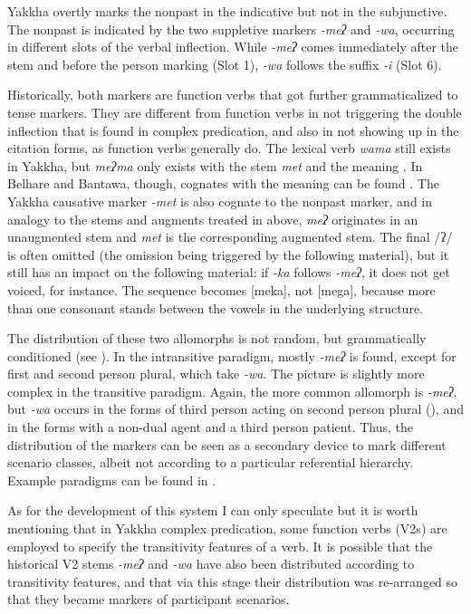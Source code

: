 Yakkha overtly marks the nonpast in the indicative but not in the subjunctive. The nonpast is indicated by the two suppletive markers \emph{-meʔ} and \emph{-wa}, occurring in different slots of the verbal inflection. While  \emph{-meʔ} comes immediately after the stem and before the person marking (Slot 1), \emph{-wa} follows the suffix \emph{-i}  (Slot 6). 

Historically, both markers are function verbs that got further grammaticalized to tense markers. They are different from function verbs in not triggering the double inflection that is found in complex predication, and also in not showing up in the citation forms, as function verbs generally do. The lexical verb \emph{wama}  still exists in Yakkha, but \emph{meʔma} only exists with the stem \emph{met} and the meaning . In Belhare and Bantawa, though, cognates with the meaning  can be found  \citep{Bickel1997Dictionary, Doornenbal2009A-grammar}. The Yakkha causative marker \emph{-met} is also cognate to the nonpast marker, and in analogy to the stems and augments treated in  above,  \emph{meʔ} originates in an unaugmented stem and \emph{met} is the corresponding augmented stem. The final /ʔ/ is often omitted (the omission being triggered by the following material), but it still has an impact on the following material: if \emph{-ka} follows \emph{-meʔ}, it does not get voiced, for instance. The sequence becomes [meka], not [mega], because more than one consonant stands between the vowels  in the underlying structure.


The distribution of these two allomorphs is not random, but grammatically conditioned (see ). In the intransitive paradigm, mostly \emph{-meʔ} is found, except for first and second person plural, which take \emph{-wa}. The picture is slightly more complex in the transitive paradigm. Again, the more common allomorph is \emph{-meʔ}, but \emph{-wa} occurs in the forms of third person acting on second person plural (), and in the forms with a non-dual agent and a third person patient. Thus, the distribution of the markers can be seen as  a secondary device to mark different scenario classes, albeit not according to a particular referential hierarchy.  Example paradigms can be found in . 

As for the development of this system I can only speculate but it is worth mentioning that in Yakkha complex predication, some function verbs (V2s) are employed to specify the transitivity features of a verb. It is possible that the historical V2 stems \emph{-meʔ} and \emph{-wa} have also been distributed according to transitivity features, and that via this stage their distribution was re-arranged so that they became markers of participant scenarios.
 

